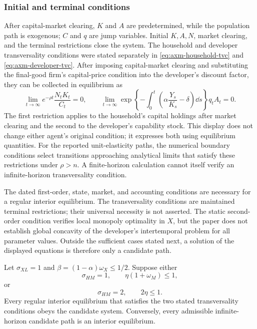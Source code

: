 \subsubsection{Initial and terminal conditions}

After capital-market clearing, \(K\) and \(A\) are predetermined, while the
population path is exogenous; \(C\) and \(q\) are jump variables. Initial
\(K,A,N\), market clearing, and the terminal restrictions close the system. The
household and developer transversality conditions were stated separately in
\eqref{eq:axm-household-tvc} and \eqref{eq:axm-developer-tvc}. After imposing
capital-market clearing and substituting the final-good firm's capital-price
condition into the developer's discount factor, they can be collected in
equilibrium as
\begin{equation}
 \lim_{t\to\infty}e^{-\rho t}\frac{N_tK_t}{C_t}=0,\qquad
 \lim_{t\to\infty}
 \exp\left\{-\int_0^t\left(\alpha\frac{Y_s}{K_s}-\delta\right)\dd s\right\}
 q_tA_t=0.
\label{eq:axm-tvc}
\end{equation}
The first restriction applies to the household's capital holdings after market
clearing and the second to the developer's capability stock. This display does
not change either agent's original condition; it expresses both using equilibrium
quantities. For the reported unit-elasticity paths, the
numerical boundary conditions select transitions approaching analytical limits
that satisfy these restrictions under \(\rho>n\). A finite-horizon calculation
cannot itself verify an infinite-horizon transversality condition.

The dated first-order, state, market, and accounting conditions are necessary for
a regular interior equilibrium. The transversality conditions are maintained
terminal restrictions; their universal necessity is not asserted. The static
second-order condition verifies local monopoly optimality in \(X\), but the
paper does not establish global concavity of the developer's intertemporal
problem for all parameter values. Outside the sufficient cases stated next, a
solution of the displayed equations is therefore only a candidate path.

\begin{proposition}
\label{prop:axm-equilibrium-sufficiency}
Let \(\sigma_{XL}=1\) and
\(\beta=(1-\alpha)\omega_X\leq1/2\). Suppose either
\[
 \sigma_{HM}=1,\qquad \eta(1+\omega_M)\leq1,
\]
or
\[
 \sigma_{HM}=2,\qquad 2\eta\leq1.
\]
Every regular interior equilibrium that satisfies the two stated transversality
conditions obeys the candidate system. Conversely, every admissible
infinite-horizon candidate path is an interior equilibrium.
\end{proposition}

